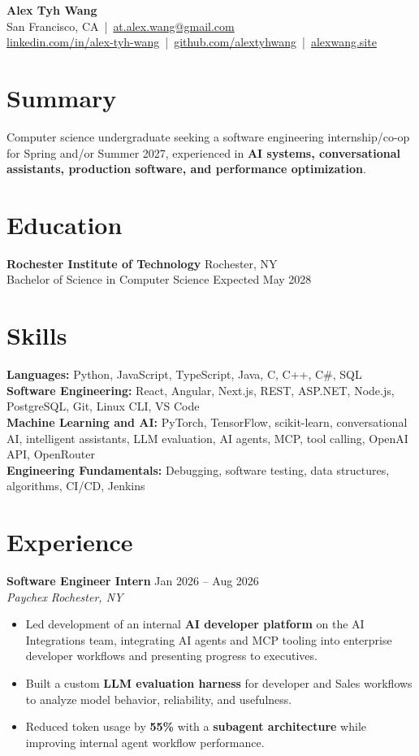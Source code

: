 \documentclass[10pt,letterpaper]{article}
\newif\ifresumeFirstRole
\newcommand{\resumeRole}[4]{%
  \ifresumeFirstRole
    \global\resumeFirstRolefalse
  \else
    \vspace{0pt plus 1fill}%
  \fi
  \textbf{#1} \hfill #2\\
  \textit{#3} \hfill \textit{#4}
}
\begin{document}
\begin{center}
{\Large \textbf{Alex Tyh Wang}}\\
San Francisco, CA \,|\, \href{mailto:at.alex.wang@gmail.com}{at.alex.wang@gmail.com}\\
\small \href{https://www.linkedin.com/in/alex-tyh-wang/}{linkedin.com/in/alex-tyh-wang} \,|\, \href{https://github.com/alextyhwang}{github.com/alextyhwang} \,|\, \href{https://alexwang.site}{alexwang.site}
\end{center}

\section*{Summary}
Computer science undergraduate seeking a software engineering internship/co-op for Spring and/or Summer 2027, experienced in \textbf{AI systems, conversational assistants, production software, and performance optimization}.

\section*{Education}
\textbf{Rochester Institute of Technology} \hfill Rochester, NY\\
Bachelor of Science in Computer Science \hfill Expected May 2028

\section*{Skills}
\textbf{Languages:} Python, JavaScript, TypeScript, Java, C, C++, C\#, SQL\\
\textbf{Software Engineering:} React, Angular, Next.js, REST, ASP.NET, Node.js, PostgreSQL, Git, Linux CLI, VS Code\\
\textbf{Machine Learning and AI:} PyTorch, TensorFlow, scikit-learn, conversational AI, intelligent assistants, LLM evaluation, AI agents, MCP, tool calling, OpenAI API, OpenRouter\\
\textbf{Engineering Fundamentals:} Debugging, software testing, data structures, algorithms, CI/CD, Jenkins

\section*{Experience}
\resumeRole{Software Engineer Intern}{Jan 2026 -- Aug 2026}{Paychex}{Rochester, NY}
\begin{itemize}
  \item Led development of an internal \textbf{AI developer platform} on the AI Integrations team, integrating AI agents and MCP tooling into enterprise developer workflows and presenting progress to executives.
  \item Built a custom \textbf{LLM evaluation harness} for developer and Sales workflows to analyze model behavior, reliability, and usefulness.
  \item Reduced token usage by \textbf{55\%} with a \textbf{subagent architecture} while improving internal agent workflow performance.
\end{itemize}
\end{document}
